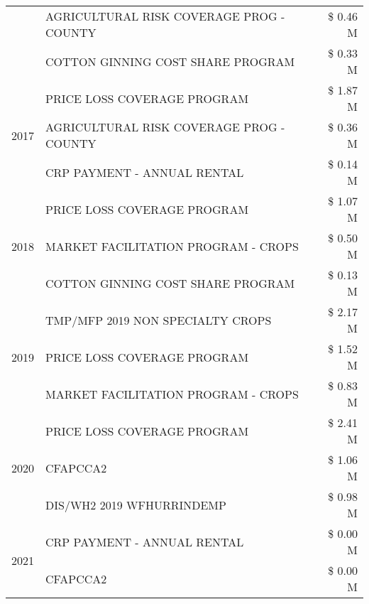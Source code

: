 \begin{tabular}{llr}
 & AGRICULTURAL RISK COVERAGE PROG - COUNTY & \$ 0.46 M \\
 & COTTON GINNING COST SHARE PROGRAM & \$ 0.33 M \\
\cline{1-3}
\multirow[t]{3}{*}{2017} & PRICE LOSS COVERAGE PROGRAM & \$ 1.87 M \\
 & AGRICULTURAL RISK COVERAGE PROG - COUNTY & \$ 0.36 M \\
 & CRP PAYMENT - ANNUAL RENTAL & \$ 0.14 M \\
\cline{1-3}
\multirow[t]{3}{*}{2018} & PRICE LOSS COVERAGE PROGRAM & \$ 1.07 M \\
 & MARKET FACILITATION PROGRAM - CROPS & \$ 0.50 M \\
 & COTTON GINNING COST SHARE PROGRAM & \$ 0.13 M \\
\cline{1-3}
\multirow[t]{3}{*}{2019} & TMP/MFP 2019 NON SPECIALTY CROPS & \$ 2.17 M \\
 & PRICE LOSS COVERAGE PROGRAM & \$ 1.52 M \\
 & MARKET FACILITATION PROGRAM - CROPS & \$ 0.83 M \\
\cline{1-3}
\multirow[t]{3}{*}{2020} & PRICE LOSS COVERAGE PROGRAM & \$ 2.41 M \\
 & CFAPCCA2 & \$ 1.06 M \\
 & DIS/WH2 2019 WFHURRINDEMP & \$ 0.98 M \\
\cline{1-3}
\multirow[t]{2}{*}{2021} & CRP PAYMENT - ANNUAL RENTAL & \$ 0.00 M \\
 & CFAPCCA2 & \$ 0.00 M \\
\cline{1-3}
\bottomrule
\end{tabular}
